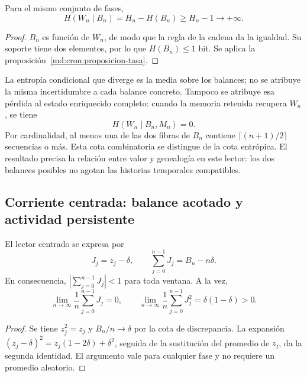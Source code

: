 \begin{corollary}
\label{md:cron:corolario-condicional}
Para el mismo conjunto de fases,
\begin{equation}
 H(W_n\mid B_n)=H_n-H(B_n)
 \geq H_n-1\longrightarrow+\infty.
 \label{md:cron:entropia-condicional}
\end{equation}
\end{corollary}
\begin{proof}
$B_n$ es función de $W_n$, de modo que la regla de la cadena da la igualdad.
Su soporte tiene dos elementos, por lo que $H(B_n)\leq1$ bit.
Se aplica la proposición~\ref{md:cron:proposicion-tasa}.
\end{proof}

La entropía condicional que diverge es la media sobre los balances;
no se atribuye la misma incertidumbre a cada balance concreto.
Tampoco se atribuye esa pérdida al estado enriquecido completo: cuando la
memoria retenida recupera $W_n$, se tiene
\begin{equation}
 H(W_n\mid B_n,M_n)=0.
 \label{md:cron:restitucion-memoria}
\end{equation}
Por cardinalidad, al menos una de las dos fibras de $B_n$ contiene
$\lceil(n+1)/2\rceil$ secuencias o más. Esta cota combinatoria se distingue
de la cota entrópica.
El resultado precisa la relación entre valor y genealogía en este lector:
los dos balances posibles no agotan las historias temporales compatibles.

\subsection{Corriente centrada: balance acotado y actividad persistente}
\label{md:cron:corriente}

El lector centrado se expresa por
\begin{equation}
 J_j=z_j-\delta,\qquad
 \sum_{j=0}^{n-1}J_j=B_n-n\delta.
 \label{md:cron:corriente-definicion}
\end{equation}
En consecuencia,
$\left|\sum_{j=0}^{n-1}J_j\right|<1$ para toda ventana.
A la vez,
\begin{equation}
 \lim_{n\to\infty}\frac1n\sum_{j=0}^{n-1}J_j=0,\qquad
 \lim_{n\to\infty}\frac1n\sum_{j=0}^{n-1}J_j^2
 =\delta(1-\delta)>0.
 \label{md:cron:actividad}
\end{equation}
\begin{proof}
Se tiene $z_j^2=z_j$ y $B_n/n\to\delta$ por la cota de discrepancia.
La expansión
$(z_j-\delta)^2=z_j(1-2\delta)+\delta^2$, seguida de la sustitución del
promedio de $z_j$, da la segunda identidad.
El argumento vale para cualquier fase y no requiere un promedio aleatorio.
\end{proof}

